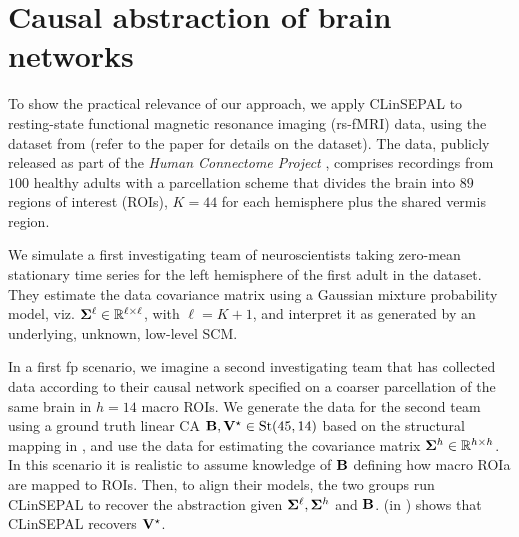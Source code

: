 \section{Causal abstraction of brain networks}\label{sec:empirical_assessment_rw}
To show the practical relevance of our approach, we apply CLinSEPAL to resting-state functional magnetic resonance imaging (rs-fMRI) data, using the dataset from \cite{gabriele2024extracting} (refer to the paper for details on the dataset). The data, publicly released as part of the \emph{Human Connectome Project} \cite{smith2013resting},
comprises recordings from $100$ healthy adults with a parcellation scheme that divides the brain into $89$ regions of interest (ROIs), $K=44$ for each hemisphere plus the shared vermis region.

We simulate a first investigating team of neuroscientists taking zero-mean stationary time series for the left hemisphere of the first adult in the dataset. They estimate the data covariance matrix using a Gaussian mixture probability model, viz. $\boldsymbol{\Sigma}^{\ell} \in \mathbb{R}^{\ell \times \ell}$, with $\ell=K+1$, and interpret it as generated by an underlying, unknown, low-level SCM.

In a first fp scenario, we imagine a second investigating team that has collected data according to their causal network specified on a coarser parcellation of the same brain in $h=14$ macro ROIs. We generate the data for the second team using a ground truth linear CA $\mathbf{B}, \mathbf{V}^\star \in \mathrm{St}({45},{14})$ based on the structural mapping in \cite{gabriele2024extracting}, and use the data for estimating the covariance matrix $\boldsymbol{\Sigma}^{h} \in \mathbb{R}^{h \times h}$. In this scenario it is realistic to assume knowledge of $\mathbf{B}$ defining how macro ROIa are mapped to ROIs. Then, to align their models, the two groups run CLinSEPAL to recover the abstraction given $\boldsymbol{\Sigma}^{\ell},\boldsymbol{\Sigma}^{h}$ and $\mathbf{B}$.  (in ) shows that CLinSEPAL recovers $\mathbf{V}^\star$.

